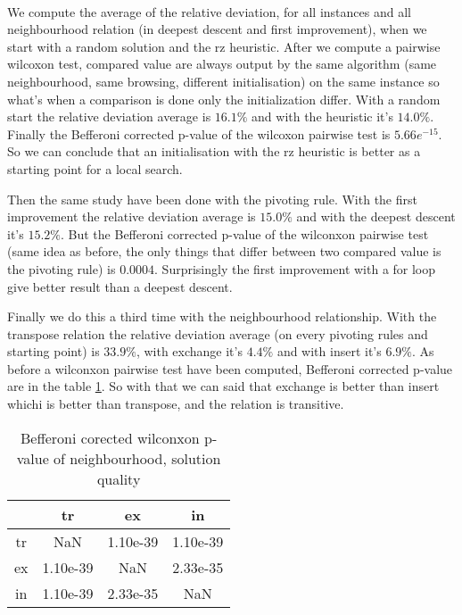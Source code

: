\documentclass[12pt,a4paper]{article}
\begin{document}
~\\

We compute the average of the relative deviation, for all instances and all neighbourhood relation (in deepest descent and first improvement), when we start with a random solution and the rz heuristic. After we compute a pairwise wilcoxon test, compared value are always output by the same algorithm (same neighbourhood, same browsing, different initialisation) on the same instance so what's when a comparison is done only the initialization differ. With a random start the relative deviation average is $16.1 \%$ and with the heuristic it's $14.0 \%$. Finally the Befferoni corrected p-value of the wilcoxon pairwise test is $5.66e^{-15}$. So we can conclude that an initialisation with the rz heuristic is better as a starting point for a local search.

Then the same study have been done with the pivoting rule. With the first improvement the relative deviation average is $15.0 \%$ and with the deepest descent it's $15.2 \%$. But the Befferoni corrected p-value of the wilconxon pairwise test (same idea as before, the only things that differ between two compared value is the pivoting rule) is $0.0004$. Surprisingly the first improvement with a for loop give better result than a deepest descent.

Finally we do this a third time with the neighbourhood relationship. With the transpose relation the relative deviation average (on every pivoting rules and starting point) is $33.9 \%$, with exchange it's $4.4 \%$ and with insert it's $6.9 \%$.
As before a wilconxon pairwise test have been computed, Befferoni corrected p-value are in the table \ref{Befferoni corected wilconxon p-value of neighbourhood}. So with that we can said that exchange is better than insert whichi is better than transpose, and the relation is transitive.

\begin{table}[!h]
\centering
\begin{tabular}{|*{4}{c|}}
  \hline
   & tr & ex & in\\
  \hline
	tr & NaN & 1.10e-39 & 1.10e-39 \\
	ex & 1.10e-39 & NaN & 2.33e-35 \\
	in & 1.10e-39 & 2.33e-35 & NaN \\
  \hline
\end{tabular}
\caption{Befferoni corected wilconxon p-value of neighbourhood, solution quality}
\label{Befferoni corected wilconxon p-value of neighbourhood}
\end{table}
\end{document}
